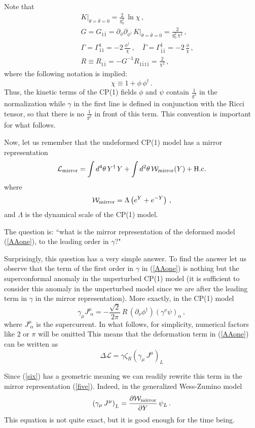 \documentclass[epsfig,12pt]{article}
\def\beq{\begin{equation}}
\def\eeq{\end{equation}}
\def\beqn{\begin{eqnarray}}
\def\eeqn{\end{eqnarray}}
\def\beqn{\begin{eqnarray}}
\def\eeqn{\end{eqnarray}}
\def\beq{\begin{equation}}
\def\eeq{\end{equation}}
\begin{document}
{Note that 
\beqn
&&
K\big|_{\theta=\bar\theta=0}=\frac{2}{g_{0}^{2}}\,\ln \chi\,, 
\nonumber
\\[2mm]
&&
G=G_{1\bar 1}=\partial_\phi\partial_{\phi^\dagger\,} 
K\big|_{\theta=\bar\theta=0}=
\frac{2}{g_{0}^2\,\chi^{2}}\,,
\nonumber
\\[2mm]
&&
\Gamma =\Gamma^{1}_{11} =- 2\, \frac{\phi^\dagger\,}{\chi}\,,\quad 
\bar\Gamma =\Gamma^{\bar 1}_{\bar 1\bar 1}=
- 2\, \frac{ \phi}{\chi}\,,
\nonumber
\\[2mm]
&&
 R \equiv  R_{1\bar 1}=-G^{-1}\!R_{1\bar 1 1\bar 1}=\frac{2}{\chi^2}\,,
\label{Atwo}
\eeqn
where the following notation
is implied:
\beq
\chi \equiv 1+\phi\,\phi^\dagger\,.
\eeq
Thus, the kinetic terms of the CP(1) fields $\phi$ and $\psi$ contain $\frac{1}{g^2}$ in the normalization
while $\gamma$ in the first line is defined in conjunction with the Ricci tensor, so that there is no $\frac{1}{g^2}$
in front of this term. This convention is important for what follows.

Now, let us remember that the undeformed CP(1) model has a mirror representation \cite{MR1,MR2}
\beq
{\mathcal L}_{\rm mirror} = \int d^4\theta\, Y^\dagger\, Y + \int d^2\theta\, {\mathcal W}_{\rm mirror}
(Y) + {\rm H.c.}
\label{five}
\eeq
where 
\beq
{\mathcal W}_{\rm mirror} = \Lambda \left( e^Y + e^{-Y}\right)\,,
\eeq
and $\Lambda$ is the dynamical scale of the CP(1) model.

The question is: ``what is the mirror representation of the deformed model (\ref{AAone}), to the leading order in $\gamma$?"

Surprisingly, this question has a very simple answer.
To find the answer let us observe that the term of the first order in $\gamma$ in (\ref{AAone})
is nothing but the superconformal anomaly in the unperturbed CP(1) model (it is sufficient to consider this anomaly in the unperturbed model since we are after the leading term in $\gamma$ in the mirror representation).
More exactly, in the CP(1) model
\beq
\gamma_\mu J^\mu_{\,\,\alpha} = -\frac{ \sqrt 2}{2\pi}\,R\, \left(\partial_\nu \phi^\dagger\right)\left(
\gamma^\nu\psi\right)_\alpha\,,
\label{six}
\eeq
where $J^\mu_{\,\,\alpha}$ is the supercurrent.
In what follows, for simplicity,  numerical factors like $2$ or $\pi$ will be omitted
This means that the deformation term in (\ref{AAone}) can be written as
\beq
\Delta {\mathcal L} = \gamma \zeta_R\left(\gamma_\mu \, J^\mu\right)_L
\label{seven}
\eeq 

Since (\ref{six}) has a geometric meaning we can readily rewrite this term in the mirror representation
(\ref{five}). Indeed, in the generalized Wess-Zumino model
\beq
\left(\gamma_\mu \, J^\mu\right)_L
 = \frac{\partial {\mathcal W}_{\rm mirror}}{\partial Y}\,\psi_L\,.
 \label{eight}
\eeq
This equation is not quite exact, but it is good enough for the time being.

}
\end{document}
